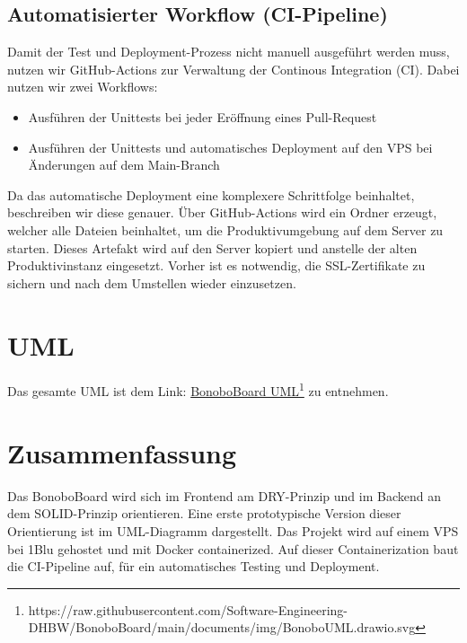 \documentclass[a4paper,11pt]{scrartcl}
\begin{document}
	\subsection{Automatisierter Workflow (CI-Pipeline)} \label{ci}
Damit der Test und Deployment-Prozess nicht manuell ausgeführt werden muss, nutzen wir GitHub-Actions zur Verwaltung der Continous Integration (CI).
Dabei nutzen wir zwei Workflows:
\begin{itemize}
	\item Ausführen der Unittests bei jeder Eröffnung eines Pull-Request
	\item Ausführen der Unittests und automatisches Deployment auf den VPS bei Änderungen auf dem Main-Branch
\end{itemize}
Da das automatische Deployment eine komplexere Schrittfolge beinhaltet, beschreiben wir diese genauer.
Über GitHub-Actions wird ein Ordner erzeugt, welcher alle Dateien beinhaltet, um die Produktivumgebung auf dem Server zu starten. Dieses Artefakt wird auf den Server kopiert und anstelle der alten Produktivinstanz eingesetzt. Vorher ist es notwendig, die SSL-Zertifikate zu sichern und nach dem Umstellen wieder einzusetzen.

\section{UML}
Das gesamte UML ist dem Link: \href{https://raw.githubusercontent.com/Software-Engineering-DHBW/BonoboBoard/main/documents/img/BonoboUML.drawio.svg}{BonoboBoard UML}\footnote{https://raw.githubusercontent.com/Software-Engineering-DHBW/BonoboBoard/main/documents/img/BonoboUML.drawio.svg} zu entnehmen. 

\section{Zusammenfassung}
Das BonoboBoard wird sich im Frontend am DRY-Prinzip und im Backend an dem SOLID-Prinzip orientieren.
Eine erste prototypische Version dieser Orientierung ist im UML-Diagramm dargestellt.
Das Projekt wird auf einem VPS bei 1Blu gehostet und mit Docker \textquotedbl containerized\textquotedbl.
Auf dieser \textquotedbl Containerization\textquotedbl{} baut die CI-Pipeline auf, für ein automatisches Testing
und Deployment.


\end{document}
